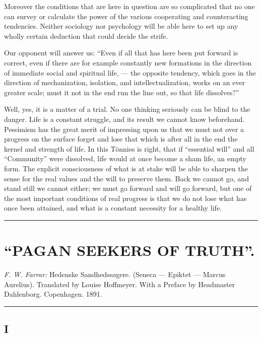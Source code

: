 \documentclass[12pt,a4paper,openany]{book}
\newcommand{\opage}[1]{\marginnote{\footnotesize\textit{[#1]}}}
\newcommand{\essay}[2][]{\chapter*{#2}\addcontentsline{toc}{chapter}{#1}}
\newcommand{\streg}{\begin{center}\rule{3em}{0.4pt}\end{center}}
\begin{document}
Moreover the conditions that are here in question are so
complicated that no one can survey or calculate the power of the various
cooperating and counteracting tendencies. Neither
sociology nor psychology will be able here to set up any
wholly certain deduction that could decide the strife.

\opage{157}Our opponent will answer us: ``Even if all that
has here been put forward is correct, even if there are for example constantly
new formations in the direction of immediate social and spiritual
life, --- the opposite tendency, which goes in the direction of
mechanization, isolation, and intellectualization, works on an ever greater
scale; must it not in the end run the line out, so that life
dissolves?''

Well, yes, it is a matter of a trial. No one thinking seriously
can be blind to the danger. Life is a constant struggle, and
its result we cannot know beforehand.
Pessimism has the great merit of impressing upon us that we must not
over a progress on the surface forget and lose that which
is after all in the end the kernel and strength of life. In this Tönnies
is right, that if ``essential will'' and all ``Community'' were dissolved,
life would at once become a sham life, an empty form.
The explicit consciousness of what is at stake will be able to
sharpen the sense for the real values and the will to
preserve them. Back we cannot go, and stand still
we cannot either; we must go forward and will go forward, but one
of the most important conditions of real progress is
that we do not lose what has once been attained, and what is
a constant necessity for a healthy life.

\streg{}

\opage{158}
\essay[Pagan Seekers of Truth]{``PAGAN SEEKERS OF TRUTH''.}

\begin{center}\emph{F. W. Farrar:} Hedenske Sandhedssøgere. (Seneca --- Epiktet --- Marcus
Aurelius). Translated by Louise Hoffmeyer. With a Preface by Headmaster
Dahlenborg. Copenhagen. 1891.\end{center}

\streg{}

\section*{I}
\end{document}
